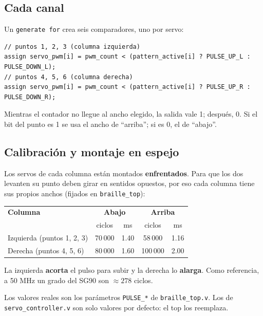 \documentclass[11pt,a4paper]{article}
\newcommand{\cod}[1]{\texttt{#1}}
\begin{document}
\subsection{Cada canal}
Un \cod{generate for} crea seis comparadores, uno por servo:
\begin{lstlisting}
// puntos 1, 2, 3 (columna izquierda)
assign servo_pwm[i] = pwm_count < (pattern_active[i] ? PULSE_UP_L : PULSE_DOWN_L);
// puntos 4, 5, 6 (columna derecha)
assign servo_pwm[i] = pwm_count < (pattern_active[i] ? PULSE_UP_R : PULSE_DOWN_R);
\end{lstlisting}
Mientras el contador no llegue al ancho elegido, la salida vale 1; después, 0. Si el
bit del punto es 1 se usa el ancho de ``arriba''; si es 0, el de ``abajo''.

\subsection{Calibración y montaje en espejo}
Los servos de cada columna están montados \textbf{enfrentados}. Para que los dos
levanten su punto deben girar en sentidos opuestos, por eso cada columna tiene sus
propios anchos (fijados en \cod{braille\_top}):

\begin{center}
\begin{tabular}{l c c c c}
\toprule
\textbf{Columna} & \multicolumn{2}{c}{\textbf{Abajo}} & \multicolumn{2}{c}{\textbf{Arriba}} \\
 & ciclos & ms & ciclos & ms \\
\midrule
Izquierda (puntos 1, 2, 3) & 70\,000 & 1.40 & 58\,000 & 1.16 \\
Derecha (puntos 4, 5, 6) & 80\,000 & 1.60 & 100\,000 & 2.00 \\
\bottomrule
\end{tabular}
\end{center}
La izquierda \textbf{acorta} el pulso para subir y la derecha lo \textbf{alarga}.
Como referencia, a 50 MHz un grado del SG90 son $\approx 278$ ciclos.

\begin{ojo}
Los valores reales son los parámetros \cod{PULSE\_*} de \cod{braille\_top.v}. Los de
\cod{servo\_controller.v} son solo valores por defecto: el top los reemplaza.
\end{ojo}
\end{document}
